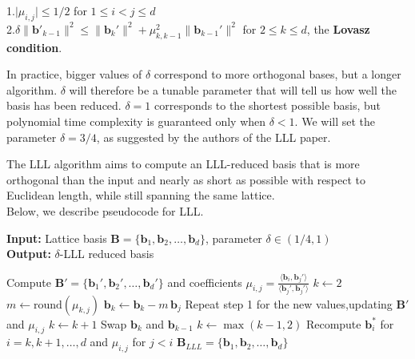 1.$\lvert\mu_{i,j}\rvert \leq 1/2$ for $1\leq i < j \leq d$ \\
2.$\delta \lVert \mathbf{b'}_{k-1}\rVert^2 \leq \lVert \mathbf{b}_{k}'\rVert^2 + \mu_{k,k-1}^2 \lVert \mathbf{b}_{k-1}'\rVert^2$ for $2\leq k \leq d$, the \textbf{Lovasz condition}.

In practice, bigger values of $\delta$ correspond to more orthogonal bases, but a longer algorithm. $\delta$ will therefore be a tunable parameter that will tell us how well the basis has been reduced. $\delta = 1$ corresponds to the shortest possible basis, but polynomial time complexity is guaranteed only when $\delta < 1$. We will set the parameter $\delta = 3/4$, as suggested by the authors of the LLL paper.

The LLL algorithm aims to compute an LLL-reduced basis that is more orthogonal than the input and nearly as short as possible with respect to Euclidean length, while still spanning the same lattice.\\ 
Below, we describe pseudocode for LLL.

\begin{algorithm}
\caption{$\delta$-LLL Algorithm}
\textbf{Input:} Lattice basis $\mathbf{B} = \{\mathbf{b}_1, \mathbf{b}_2, \dots, \mathbf{b}_d\}$, parameter $\delta \in (1/4,1)$ \\
\textbf{Output:} $\delta$-LLL reduced basis
\begin{algorithmic}[1]
\State Compute $\mathbf{B}' = \{\mathbf{b}_1', \mathbf{b}_2', \dots, \mathbf{b}_d'\}$ and coefficients $\mu_{i,j} = \frac{\langle \mathbf{b}_i,\mathbf{b}_j' \rangle}{\langle \mathbf{b}_j',\mathbf{b}_j' \rangle}$
\State $k \gets 2$
                \State $m \gets \text{round}(\mu_{k,j})$
                \State $\mathbf{b}_k \gets \mathbf{b}_k - m \, \mathbf{b}_j$
                \State Repeat step 1 for the new values,updating $\mathbf{B}'$ and $\mu_{i,j}$
            \EndIf
    \EndFor
        \State $k \gets k + 1$
    \Else
        \State Swap $\mathbf{b}_k$ and $\mathbf{b}_{k-1}$
        \State $k \gets \max(k-1,2)$
        \State Recompute $\mathbf{b}_i^*$ for $i = k,k+1,\dots ,d$ and $\mu_{i,j}$ for $j<i$
    \EndIf
\EndWhile
\State \Return $\mathbf{B}_{LLL} = \{\mathbf{b}_1, \mathbf{b}_2, \dots, \mathbf{b}_d\}$
\end{algorithmic}
\end{algorithm}

